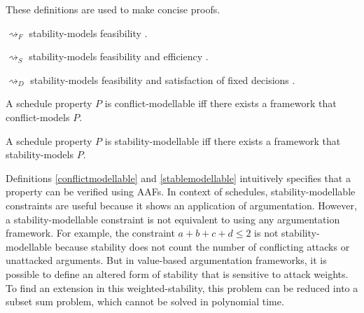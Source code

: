 These definitions are used to make concise proofs.

\begin{proposition}
	$\rightsquigarrow_F$ stability-models feasibility \cite{aes}.
\end{proposition}

\begin{proposition}
	$\rightsquigarrow_S$ stability-models feasibility and efficiency \cite{aes}.
\end{proposition}

\begin{proposition}
	$\rightsquigarrow_D$ stability-models feasibility and satisfaction of fixed decisions \cite{aes}.
\end{proposition}

\begin{definition}
	\label{conflictmodellable}
	
	A schedule property $P$ is conflict-modellable iff there exists a framework that conflict-models $P$.
\end{definition}

\begin{definition}
	\label{stablemodellable}
	
	A schedule property $P$ is stability-modellable iff there exists a framework that stability-models $P$.
\end{definition}

Definitions \ref{conflictmodellable} and \ref{stablemodellable} intuitively specifies that a property can be verified using AAFs. In context of schedules, stability-modellable constraints are useful because it shows an application of argumentation. However, a stability-modellable constraint is not equivalent to using any argumentation framework. For example, the constraint $a+b+c+d\leq 2$ is not stability-modellable because stability does not count the number of conflicting attacks or unattacked arguments. But in value-based argumentation frameworks, it is possible to define an altered form of stability that is sensitive to attack weights. To find an extension in this weighted-stability, this problem can be reduced into a subset sum problem, which cannot be solved in polynomial time.

